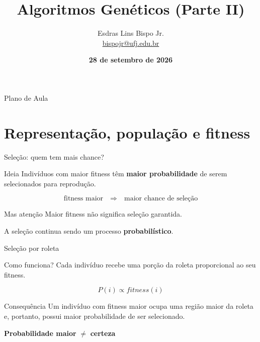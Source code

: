 \documentclass[xcolor=dvipsnames,table]{beamer}
\title{Algoritmos Genéticos (Parte II)}
\author{
  Esdras Lins Bispo Jr. \\ \url{bispojr@ufj.edu.br}
  }
\institute{
  Inteligência Artificial \\Bacharelado em Ciência da Computação}
\date{\textbf{28 de setembro de 2026} }
\begin{document}
	\begin{frame}
		\titlepage
	\end{frame}

	\AtBeginSection{
		\begin{frame}{Sumário}%
    		\tableofcontents[currentsection]
		\end{frame}
	}

	\begin{frame}{Plano de Aula}
		\tableofcontents
	\end{frame}   

    \section{Representação, população e fitness}

\begin{frame}{Seleção: quem tem mais chance?}

    \begin{block}{Ideia}
        Indivíduos com maior fitness têm \textbf{maior probabilidade}
        de serem selecionados para reprodução.
    \end{block}

    \begin{center}
        \Large
        \[
        \boxed{\text{fitness maior}
        \quad\Longrightarrow\quad
        \text{maior chance de seleção}}
        \]
    \end{center}

    \begin{block}{Mas atenção}
        Maior fitness não significa seleção garantida.
        
        \medskip
        
        A seleção continua sendo um processo \textbf{probabilístico}.
    \end{block}

\end{frame}

\begin{frame}{Seleção por roleta}

    \begin{block}{Como funciona?}
        Cada indivíduo recebe uma porção da roleta proporcional
        ao seu fitness.
    \end{block}

    \begin{center}
        \Large
        \[
        P(i) \propto fitness(i)
        \]
    \end{center}

    \begin{block}{Consequência}
        Um indivíduo com fitness maior ocupa uma região maior
        da roleta e, portanto, possui maior probabilidade de
        ser selecionado.
    \end{block}

    \begin{center}
        \textbf{Probabilidade maior} $\neq$ \textbf{certeza}
    \end{center}

\end{frame}
\end{document}
